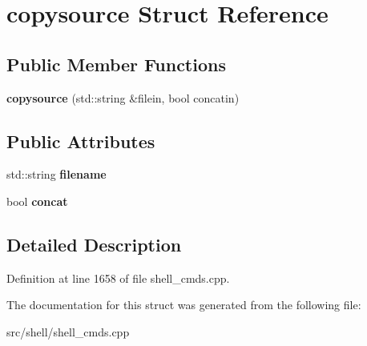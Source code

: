 \hypertarget{structcopysource}{\section{copysource Struct Reference}
\label{structcopysource}
}
\subsection*{Public Member Functions}
\begin{DoxyCompactItemize}
\item 
\hypertarget{structcopysource_a11bd7293283f1138e02174a01bc01550}{{\bfseries copysource} (std\-::string \&filein, bool concatin)}\label{structcopysource_a11bd7293283f1138e02174a01bc01550}

\end{DoxyCompactItemize}
\subsection*{Public Attributes}
\begin{DoxyCompactItemize}
\item 
\hypertarget{structcopysource_a53465278c86308205dd85bcb4277773d}{std\-::string {\bfseries filename}}\label{structcopysource_a53465278c86308205dd85bcb4277773d}

\item 
\hypertarget{structcopysource_afc69446550cf7febabeeba26122b0e84}{bool {\bfseries concat}}\label{structcopysource_afc69446550cf7febabeeba26122b0e84}

\end{DoxyCompactItemize}


\subsection{Detailed Description}


Definition at line 1658 of file shell\-\_\-cmds.\-cpp.



The documentation for this struct was generated from the following file\-:\begin{DoxyCompactItemize}
\item 
src/shell/shell\-\_\-cmds.\-cpp\end{DoxyCompactItemize}
